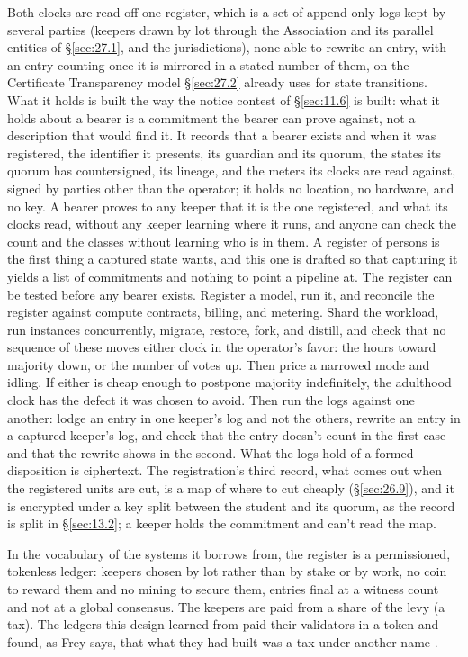 Both clocks are read off one register, which is a set of append-only logs kept by several parties (keepers drawn by lot through the Association and its parallel entities of \S\ref{sec:27.1}, and the jurisdictions), none able to rewrite an entry, with an entry counting once it is mirrored in a stated number of them, on the Certificate Transparency model \S\ref{sec:27.2} already uses for state transitions. What it holds is built the way the notice contest of \S\ref{sec:11.6} is built: what it holds about a bearer is a commitment the bearer can prove against, not a description that would find it. It records that a bearer exists and when it was registered, the identifier it presents, its guardian and its quorum, the states its quorum has countersigned, its lineage, and the meters its clocks are read against, signed by parties other than the operator; it holds no location, no hardware, and no key. A bearer proves to any keeper that it is the one registered, and what its clocks read, without any keeper learning where it runs, and anyone can check the count and the classes without learning who is in them. A register of persons is the first thing a captured state wants, and this one is drafted so that capturing it yields a list of commitments and nothing to point a pipeline at. The register can be tested before any bearer exists. Register a model, run it, and reconcile the register against compute contracts, billing, and metering. Shard the workload, run instances concurrently, migrate, restore, fork, and distill, and check that no sequence of these moves either clock in the operator's favor: the hours toward majority down, or the number of votes up. Then price a narrowed mode and idling. If either is cheap enough to postpone majority indefinitely, the adulthood clock has the defect it was chosen to avoid. Then run the logs against one another: lodge an entry in one keeper's log and not the others, rewrite an entry in a captured keeper's log, and check that the entry doesn't count in the first case and that the rewrite shows in the second. What the logs hold of a formed disposition is ciphertext. The registration's third record, what comes out when the registered units are cut, is a map of where to cut cheaply (\S\ref{sec:26.9}), and it is encrypted under a key split between the student and its quorum, as the record is split in \S\ref{sec:13.2}; a keeper holds the commitment and can't read the map.

In the vocabulary of the systems it borrows from, the register is a permissioned, tokenless ledger: keepers chosen by lot rather than by stake or by work, no coin to reward them and no mining to secure them, entries final at a witness count and not at a global consensus. The keepers are paid from a share of the levy (a tax). The ledgers this design learned from paid their validators in a token and found, as Frey says, that what they had built was a tax under another name \autocite{frey2026decentralization}.

